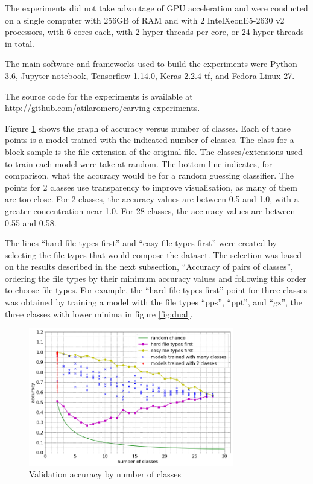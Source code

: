 The experiments did not take advantage of GPU acceleration and were  conducted on a single computer with 256GB of RAM and with 2 Intel\textregistered Xeon\textregistered E5-2630 v2 processors, with 6 cores each, with 2 hyper-threads per core, or 24 hyper-threads in total. 


The main software and frameworks used to build the experiments were Python 3.6, Jupyter notebook, Tensorflow 1.14.0, Keras 2.2.4-tf, and Fedora Linux 27.

The source code for the experiments is available at \sloppy\url{http://github.com/atilaromero/carving-experiments}.


Figure \ref{fig:nclasses} shows the graph of accuracy versus number of classes.  Each of those points is a model trained with the indicated number of classes. The class for a block sample is the file extension of the original file. The classes/extensions used to train each model were take at random. The bottom line indicates, for comparison, what the accuracy would be for a random guessing classifier. The points for 2 classes use transparency to improve visualisation, as many of them are too close. For 2 classes, the accuracy values are between 0.5 and 1.0, with a greater concentration near 1.0. For 28 classes, the accuracy values are between 0.55 and 0.58.


The lines ``hard file types first'' and ``easy file types first'' were created by selecting the file types that would compose the dataset. The selection was based on the results described in the next subsection, ``Accuracy of pairs of classes'', ordering the file types by their minimum accuracy values and following this order to choose file types. For example, the ``hard file types first'' point for three classes was obtained by training a model with the file types ``pps'', ``ppt'', and ``gz'', the three classes with lower minima in figure \ref{fig:dual}.

\noindent
\begin{figure}[htb!]
\centering\includegraphics[width=0.8\textwidth]{content/nclasses.png}
\caption{\label{fig:nclasses}Validation accuracy by number of classes}%
\end{figure}

